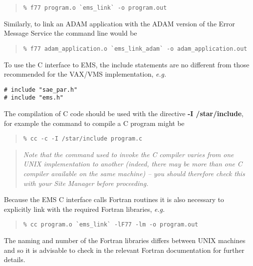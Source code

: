 \begin {quote}
\begin{verbatim}
% f77 program.o `ems_link` -o program.out
\end{verbatim}
\end {quote}

Similarly, to link an ADAM application with the ADAM version of the 
Error Message Service the command line would be 

\begin {quote}
\begin{verbatim}
% f77 adam_application.o `ems_link_adam` -o adam_application.out
\end{verbatim}
\end {quote}

To use the C interface to EMS, the include statements are no different from
those recommended for the VAX/VMS implementation, {\em e.g.}

\begin{verbatim}
# include "sae_par.h"
# include "ems.h"
\end{verbatim}

The compilation of C code should be used with the directive {\bf -I
/star/include}, for example the command to compile a C program might be

\begin {quote}
\begin{verbatim}
% cc -c -I /star/include program.c
\end{verbatim}
\end {quote}

\begin {quote}
{\em Note that the command used to invoke the C compiler varies from 
one UNIX implementation to another (indeed, there may be more than one C
compiler available on the same machine) -- you should therefore check this
with your Site Manager before proceeding.}
\end {quote}

Because the EMS C interface calls Fortran routines it is also necessary to
explicitly link with the required Fortran libraries, {\em e.g.}

\begin {quote}
\begin{verbatim}
% cc program.o `ems_link` -lF77 -lm -o program.out
\end{verbatim}
\end {quote}

The naming and number of the Fortran libraries differs between UNIX machines 
and so it is advisable to check in the relevant Fortran documentation for 
further details.


